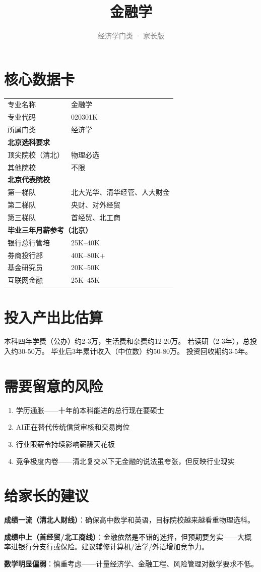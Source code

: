 \documentclass[a4paper,12pt]{ctexart}
\title{\textcolor{blue!70!black}{\Huge\textbf{金融学}}}
\subtitle{\textcolor{gray}{经济学门类 · 家长版}}
\author{}
\date{}
\begin{document}
\maketitle
\thispagestyle{empty}

\section{核心数据卡}

\begin{tabular}{ll}
\toprule
专业名称 & 金融学 \\
专业代码 & 020301K \\
所属门类 & 经济学 \\
\midrule
\multicolumn{2}{l}{\textbf{北京选科要求}} \\
\quad 顶尖院校（清北） & 物理必选 \\
\quad 其他院校 & 不限 \\
\midrule
\multicolumn{2}{l}{\textbf{北京代表院校}} \\
\quad 第一梯队 & 北大光华、清华经管、人大财金 \\
\quad 第二梯队 & 央财、对外经贸 \\
\quad 第三梯队 & 首经贸、北工商 \\
\midrule
\multicolumn{2}{l}{\textbf{毕业三年月薪参考（北京）}} \\
\quad 银行总行管培 & 25K--40K \\
\quad 券商投行部 & 40K--80K+ \\
\quad 基金研究员 & 20K--50K \\
\quad 互联网金融 & 25K--45K \\
\bottomrule
\end{tabular}

\section{投入产出比估算}

本科四年学费（公办）约2-3万，生活费和杂费约12-20万。
若读研（2-3年），总投入约30-50万。
毕业后3年累计收入（中位数）约50-80万。
投资回收期约3-5年。

\section{需要留意的风险}

\begin{enumerate}
  \item 学历通胀——十年前本科能进的总行现在要硕士
  \item AI正在替代传统信贷审核和交易岗位
  \item 行业限薪令持续影响薪酬天花板
  \item 竞争极度内卷——清北复交以下无金融的说法虽夸张，但反映行业现实
\end{enumerate}

\section{给家长的建议}

\textbf{成绩一流（清北人财线）}：确保高中数学和英语，目标院校越来越看重物理选科。

\textbf{成绩中上（首经贸/北工商线）}：金融依然是不错的选择，但预期要务实——大概率进银行分支行或保险。建议辅修计算机/法学/外语增加竞争力。

\textbf{数学明显偏弱}：慎重考虑——计量经济学、金融工程、风险管理对数学要求不低。
\end{document}
